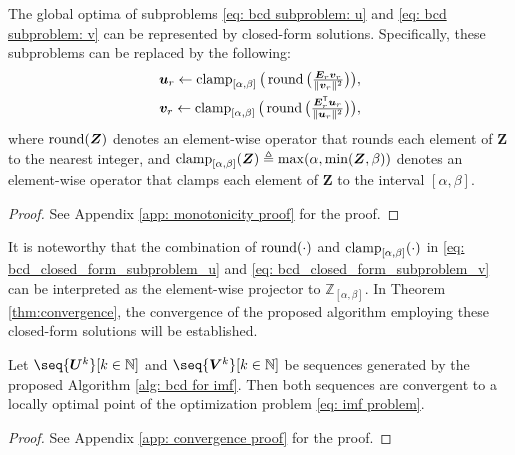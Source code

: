 \begin{theorem}[Monotonicity] \label{the: bcd subproblem}
    The global optima of subproblems \eqref{eq: bcd subproblem: u} and \eqref{eq: bcd subproblem: v} can be represented by closed-form solutions. Specifically, these subproblems can be replaced by the following:
    \begin{align} 
            \textstyle \bm{u}_r \gets \operatorname{clamp}_{[\alpha,\beta]}\big(\operatorname{round}\big(\frac{\bm{E}_r \bm{v}_r}{\lVert \bm{v}_r \rVert^2}\big)\big), \label{eq: bcd_closed_form_subproblem_u}\\
            \textstyle \bm{v}_r \gets \operatorname{clamp}_{[\alpha,\beta]}\big(\operatorname{round}\big(\frac{\bm{E}_r^\mathsf{T} \bm{u}_r}{\lVert \bm{u}_r \rVert^2}\big)\big),             
        \label{eq: bcd_closed_form_subproblem_v}
    \end{align}
    where $\operatorname{round}(\bm{Z})$ denotes an element-wise operator that rounds each element of $\bm{Z}$ to the nearest integer, and $\operatorname{clamp}_{[\alpha,\beta]}(\bm{Z}) \triangleq \max(\alpha, \min(\bm{Z}, \beta))$ denotes an element-wise operator that clamps each element of $\bm{Z}$ to the interval $[\alpha,\beta]$.
\end{theorem}
\begin{proof}
	See Appendix \ref{app: monotonicity proof} for the proof.
\end{proof}

It is noteworthy that the combination of $\operatorname{round}(\cdot)$ and $\operatorname{clamp}_{[\alpha,\beta]}(\cdot)$ in \eqref{eq: bcd_closed_form_subproblem_u} and \eqref{eq: bcd_closed_form_subproblem_v} can be interpreted as the element-wise projector to $\mathbb{Z}_{[\alpha,\beta]}$. In Theorem \ref{thm:convergence}, the convergence of the proposed algorithm employing these closed-form solutions will be established.

\begin{theorem}\label{thm:convergence}
    Let $\seq{\bm U^k}[k\in\N]$ and $\seq{\bm V^k}[k\in\N]$ be sequences generated by the proposed Algorithm \ref{alg: bcd for imf}. Then both sequences are convergent to a locally optimal point of the optimization problem \eqref{eq: imf problem}.
\end{theorem}
\begin{proof}
    See Appendix \ref{app: convergence proof} for the proof.
\end{proof}




